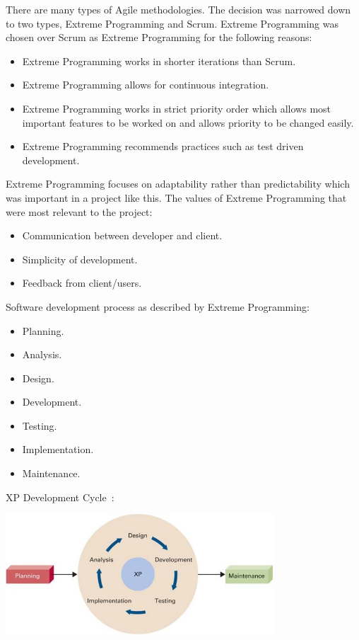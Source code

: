 There are many types of Agile methodologies. The decision was narrowed down to two types, Extreme Programming and Scrum. Extreme Programming was chosen over Scrum as Extreme Programming for the following reasons:
\begin{itemize}
\item Extreme Programming works in shorter iterations than Scrum.
\item Extreme Programming allows for continuous integration.
\item Extreme Programming works in strict priority order which allows most important features to be worked on and allows priority to be changed easily.
\item Extreme Programming recommends practices such as test driven development.
\end{itemize}	


Extreme Programming focuses on adaptability rather than predictability which was important in a project like this.
The values of Extreme Programming that were most relevant to the project:
\begin{itemize}
\item Communication between developer and client.
\item Simplicity of development.
\item Feedback from client/users.
\end{itemize}	

Software development process as described by Extreme Programming:
\begin{itemize}
\item Planning.
\item Analysis.
\item Design.
\item Development.
\item Testing.
\item Implementation.
\item Maintenance.
\end{itemize}	

XP Development Cycle~\cite{XPphoto}:

    \begin{center}    
      \includegraphics[width=100mm,scale=0.8]{img/XP.jpg}  
    \end{center}



